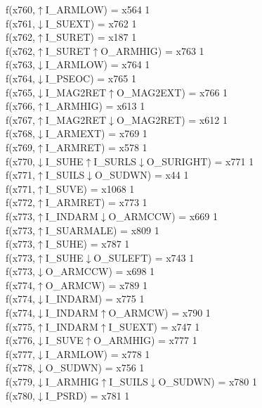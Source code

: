 f(x760,$\uparrow$I\_ARMLOW) = x564 {1} \\
f(x761,$\downarrow$I\_SUEXT) = x762 {1} \\
f(x762,$\uparrow$I\_SURET) = x187 {1} \\
f(x762,$\uparrow$I\_SURET$\uparrow$O\_ARMHIG) = x763 {1} \\
f(x763,$\downarrow$I\_ARMLOW) = x764 {1} \\
f(x764,$\downarrow$I\_PSEOC) = x765 {1} \\
f(x765,$\downarrow$I\_MAG2RET$\uparrow$O\_MAG2EXT) = x766 {1} \\
f(x766,$\uparrow$I\_ARMHIG) = x613 {1} \\
f(x767,$\uparrow$I\_MAG2RET$\downarrow$O\_MAG2RET) = x612 {1} \\
f(x768,$\downarrow$I\_ARMEXT) = x769 {1} \\
f(x769,$\uparrow$I\_ARMRET) = x578 {1} \\
f(x770,$\downarrow$I\_SUHE$\uparrow$I\_SURLS$\downarrow$O\_SURIGHT) = x771 {1} \\
f(x771,$\uparrow$I\_SUILS$\downarrow$O\_SUDWN) = x44 {1} \\
f(x771,$\uparrow$I\_SUVE) = x1068 {1} \\
f(x772,$\uparrow$I\_ARMRET) = x773 {1} \\
f(x773,$\uparrow$I\_INDARM$\downarrow$O\_ARMCCW) = x669 {1} \\
f(x773,$\uparrow$I\_SUARMALE) = x809 {1} \\
f(x773,$\uparrow$I\_SUHE) = x787 {1} \\
f(x773,$\uparrow$I\_SUHE$\downarrow$O\_SULEFT) = x743 {1} \\
f(x773,$\downarrow$O\_ARMCCW) = x698 {1} \\
f(x774,$\uparrow$O\_ARMCW) = x789 {1} \\
f(x774,$\downarrow$I\_INDARM) = x775 {1} \\
f(x774,$\downarrow$I\_INDARM$\uparrow$O\_ARMCW) = x790 {1} \\
f(x775,$\uparrow$I\_INDARM$\uparrow$I\_SUEXT) = x747 {1} \\
f(x776,$\downarrow$I\_SUVE$\uparrow$O\_ARMHIG) = x777 {1} \\
f(x777,$\downarrow$I\_ARMLOW) = x778 {1} \\
f(x778,$\downarrow$O\_SUDWN) = x756 {1} \\
f(x779,$\downarrow$I\_ARMHIG$\uparrow$I\_SUILS$\downarrow$O\_SUDWN) = x780 {1} \\
f(x780,$\downarrow$I\_PSRD) = x781 {1} \\

